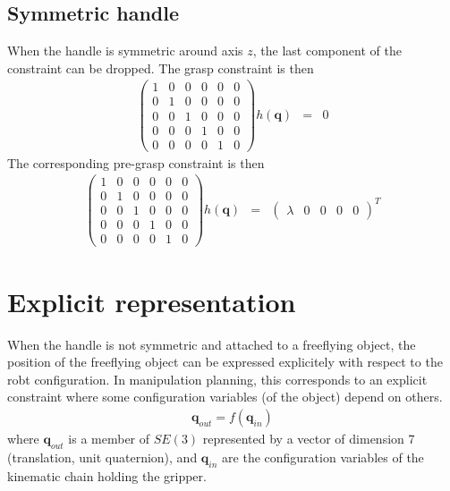 \documentclass {article}
\newcommand\conf{\mathbf{q}}
\begin{document}
\subsection {Symmetric handle}

When the handle is symmetric around axis $z$, the last component of the constraint can be dropped. The grasp constraint is then
\begin {eqnarray}\label {eq:symmetric-handle}
  \left(\begin{array}{cccccc}
    1 & 0 & 0 & 0 & 0 & 0 \\
    0 & 1 & 0 & 0 & 0 & 0 \\
    0 & 0 & 1 & 0 & 0 & 0 \\
    0 & 0 & 0 & 1 & 0 & 0 \\
    0 & 0 & 0 & 0 & 1 & 0 \end{array}\right) h (\conf) &=& 0
\end {eqnarray}
The corresponding pre-grasp constraint is then
\begin {eqnarray}\label {eq:symmetric-handle-pregrasp}
  \left(\begin{array}{cccccc}
    1 & 0 & 0 & 0 & 0 & 0 \\
    0 & 1 & 0 & 0 & 0 & 0 \\
    0 & 0 & 1 & 0 & 0 & 0 \\
    0 & 0 & 0 & 1 & 0 & 0 \\
    0 & 0 & 0 & 0 & 1 & 0 \end{array}\right) h (\conf) &=&
  \left (\begin {array}{cccccc} \lambda & 0 & 0 & 0 & 0 \end{array}\right)^{T}
\end {eqnarray}

\section {Explicit representation}

When the handle is not symmetric and attached to a freeflying object, the position of the freeflying object can be expressed explicitely with respect to the robt configuration. In manipulation planning, this corresponds to an explicit constraint where some configuration variables (of the object) depend on others.
\begin {eqnarray}\label{eq:explicit}
  \conf_{out} = f (\conf_{in})
\end {eqnarray}
where $\conf_{out}$ is a member of $SE(3)$ represented by a vector of
dimension 7 (translation, unit quaternion), and $\conf_{in}$ are the configuration variables of the kinematic chain holding the gripper.
\end{document}
